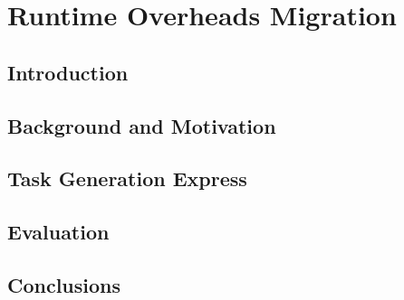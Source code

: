 \newcommand{\proposal}{TaskGenX}
\chapter{Runtime Overheads Migration}
\section{Introduction}
\label{sec:intro}



\section{Background and Motivation}
\label{sec:background}


\section{Task Generation Express}
\label{sec:ram}






\section{Evaluation}
\label{sec:evaluation}


%

\section{Conclusions}
\label{sec:conclusions}


